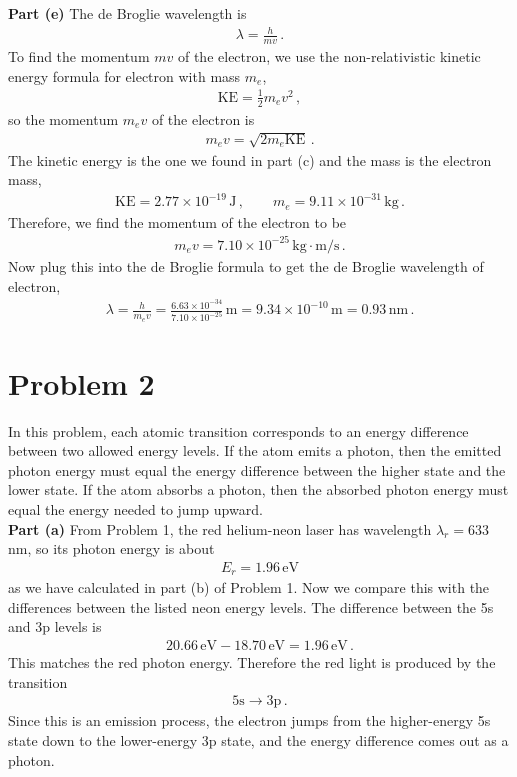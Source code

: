 \documentclass[11pt]{article}
\begin{document}
\noindent\textbf{Part (e)} The de Broglie wavelength is
\begin{align*}
\lambda = \frac{h}{mv}\,.
\end{align*}
To find the momentum $mv$ of the electron, we use the non-relativistic kinetic energy formula for electron with mass $m_e$, 
\begin{align*}
\text{KE} = \frac{1}{2}m_ev^2\,,
\end{align*}
so the momentum $m_ev$ of the electron is
\begin{align*}
m_ev = \sqrt{2m_e\text{KE}}\,.
\end{align*}
The kinetic energy is the one we found in part (c) and the mass is the electron mass,
\begin{align*}
\text{KE} = 2.77\times 10^{-19}\,\text{J}\,,\qquad
m_e = 9.11\times 10^{-31}\,\text{kg}\,.
\end{align*}
Therefore, we find the momentum of the electron to be
\begin{align*}
m_ev = 7.10\times 10^{-25}\,\text{kg}\cdot\text{m/s}\,.
\end{align*}
Now plug this into the de Broglie formula to get the de Broglie wavelength of electron,
\begin{align*}
\lambda = \frac{h}{m_ev}=\frac{6.63\times 10^{-34}}{7.10\times 10^{-25}}\,\text{m}
= 9.34\times 10^{-10}\,\text{m}= 0.93\,\text{nm}\,.
\end{align*}


\section*{Problem 2}
In this problem, each atomic transition corresponds to an energy difference between two allowed energy levels. If the atom emits a photon, then the emitted photon energy must equal the energy difference between the higher state and the lower state. If the atom absorbs a photon, then the absorbed photon energy must equal the energy needed to jump upward.\\

\noindent\textbf{Part (a)} From Problem 1, the red helium-neon laser has wavelength $\lambda_r = 633\,$nm, so its photon energy is about
\begin{align*}
E_r = 1.96\,\text{eV}
\end{align*}
as we have calculated in part (b) of Problem 1. Now we compare this with the differences between the listed neon energy levels. The difference between the 5s and 3p levels is
\begin{align*}
20.66\,\text{eV} - 18.70\,\text{eV} = 1.96\,\text{eV}\,.
\end{align*}
This matches the red photon energy. Therefore the red light is produced by the transition
\begin{align*}
\text{5s} \longrightarrow \text{3p}\,.
\end{align*}
Since this is an emission process, the electron jumps from the higher-energy 5s state down to the lower-energy 3p state, and the energy difference comes out as a photon.\\
\end{document}
